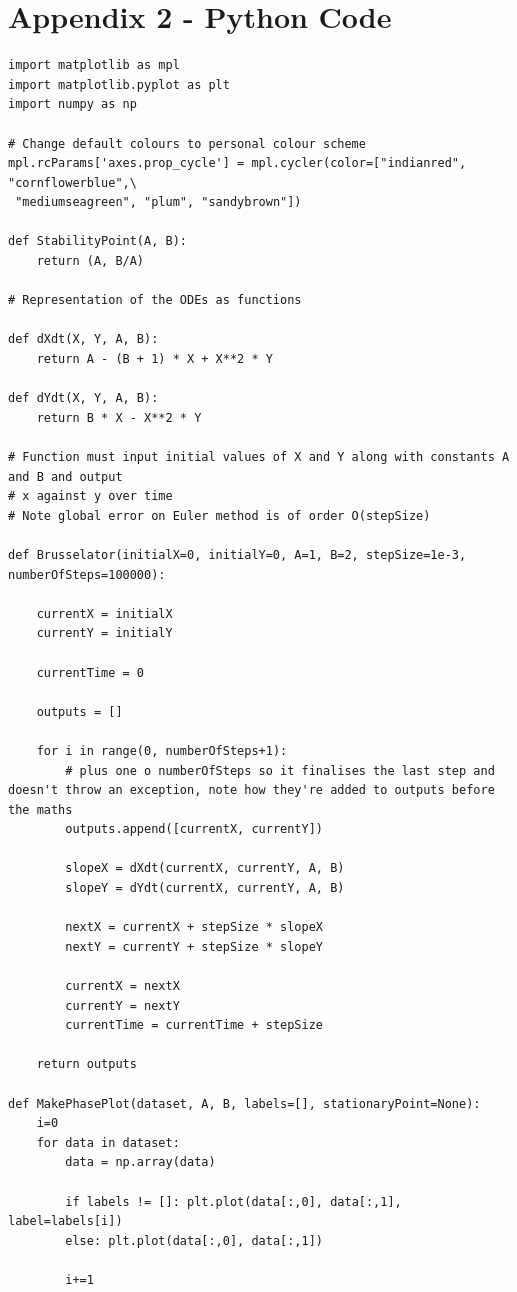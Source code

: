 \documentclass[reprint, amsmath, amssymb, aps]{revtex4-2}
\begin{document}
\section*{Appendix 2 - Python Code}
\begin{lstlisting}
import matplotlib as mpl
import matplotlib.pyplot as plt
import numpy as np

# Change default colours to personal colour scheme
mpl.rcParams['axes.prop_cycle'] = mpl.cycler(color=["indianred", "cornflowerblue",\
 "mediumseagreen", "plum", "sandybrown"])
 
def StabilityPoint(A, B):
    return (A, B/A)
    
# Representation of the ODEs as functions

def dXdt(X, Y, A, B):
    return A - (B + 1) * X + X**2 * Y

def dYdt(X, Y, A, B):
    return B * X - X**2 * Y
    
# Function must input initial values of X and Y along with constants A and B and output
# x against y over time
# Note global error on Euler method is of order O(stepSize)

def Brusselator(initialX=0, initialY=0, A=1, B=2, stepSize=1e-3, numberOfSteps=100000):

    currentX = initialX
    currentY = initialY

    currentTime = 0

    outputs = []

    for i in range(0, numberOfSteps+1):
        # plus one o numberOfSteps so it finalises the last step and doesn't throw an exception, note how they're added to outputs before the maths
        outputs.append([currentX, currentY])

        slopeX = dXdt(currentX, currentY, A, B)
        slopeY = dYdt(currentX, currentY, A, B)

        nextX = currentX + stepSize * slopeX
        nextY = currentY + stepSize * slopeY

        currentX = nextX
        currentY = nextY
        currentTime = currentTime + stepSize

    return outputs
    
def MakePhasePlot(dataset, A, B, labels=[], stationaryPoint=None):
    i=0
    for data in dataset:
        data = np.array(data)

        if labels != []: plt.plot(data[:,0], data[:,1], label=labels[i])
        else: plt.plot(data[:,0], data[:,1])

        i+=1


\end{lstlisting}
\end{document}
